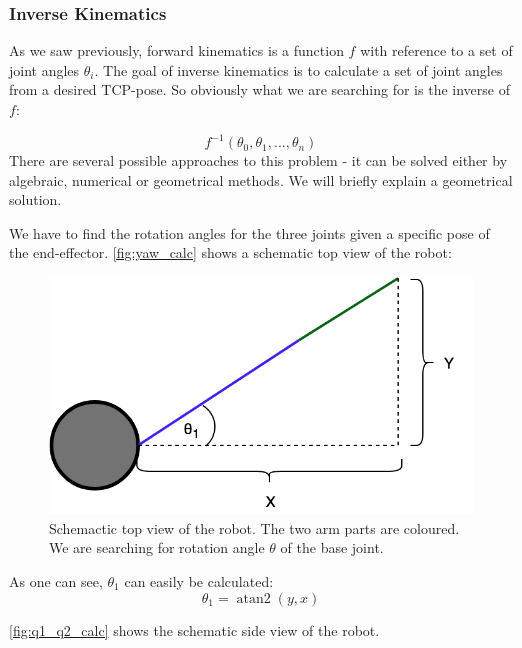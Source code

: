 \documentclass[conference]{IEEEtran}
\DeclareMathOperator{\atantwo}{atan2}
\begin{document}
\subsubsection{Inverse Kinematics}\label{sec:inversekinematics}
As we saw previously, forward kinematics is a function $f$ with reference to a set of joint angles $\theta_i$. The goal of inverse kinematics is to calculate a set of joint angles from a desired TCP-pose. So obviously what we are searching for is the inverse of $f$:

\begin{equation}
f^{-1}(\theta_0, \theta_1, ..., \theta_n)
\end{equation}
There are several possible approaches to this problem - it can be solved either by algebraic, numerical or geometrical methods. We will briefly explain a geometrical solution.

We have to find the rotation angles for the three joints given a specific pose of the end-effector.
\autoref{fig:yaw_calc} shows a schematic top view of the robot:

\begin{figure}[htbp]
	\centerline{\includegraphics[scale=0.3]{img/kin_yaw_arm_top_view.png}}
	\caption{Schemactic top view of the robot. The two arm parts are coloured. We are searching for rotation angle $\theta$ of the base joint.}
	\label{fig:yaw_calc}
\end{figure}

As one can see, $\theta_1$ can easily be calculated:
\begin{equation}
\theta_1 = \atantwo(y,x)
\end{equation}

\autoref{fig:q1_q2_calc} shows the schematic side view of the robot.
\end{document}
